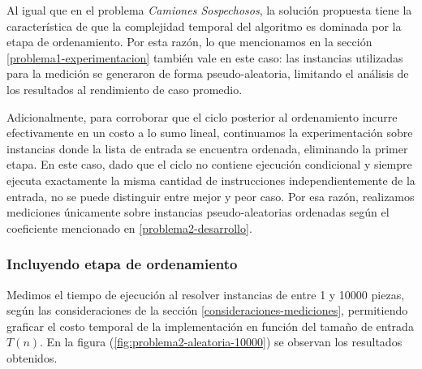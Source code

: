 

Al igual que en el problema \emph{Camiones Sospechosos}, la solución propuesta tiene la característica de que la complejidad temporal del algoritmo es dominada por la etapa de ordenamiento. Por esta razón, lo que mencionamos en la sección \ref{problema1-experimentacion} también vale en este caso: las instancias utilizadas para la medición se generaron de forma pseudo-aleatoria, limitando el análisis de los resultados al rendimiento de caso promedio. 

Adicionalmente, para corroborar que el ciclo posterior al ordenamiento incurre efectivamente en un costo a lo sumo lineal, continuamos la experimentación sobre instancias donde la lista de entrada se encuentra ordenada, eliminando la primer etapa. En este caso, dado que el ciclo no contiene ejecución condicional y siempre ejecuta exactamente la misma cantidad de instrucciones independientemente de la entrada, no se puede distinguir entre mejor y peor caso. Por esa razón, realizamos mediciones únicamente sobre instancias pseudo-aleatorias ordenadas según el coeficiente mencionado en \ref{problema2-desarrollo}.

\subsubsection{Incluyendo etapa de ordenamiento}

Medimos el tiempo de ejecución al resolver instancias de entre 1 y 10000 piezas, según las consideraciones de la sección \ref{consideraciones-mediciones}, permitiendo graficar el costo temporal de la implementación en función del tamaño de entrada $T(n)$. En la figura (\ref{fig:problema2-aleatoria-10000}) se observan los resultados obtenidos.

